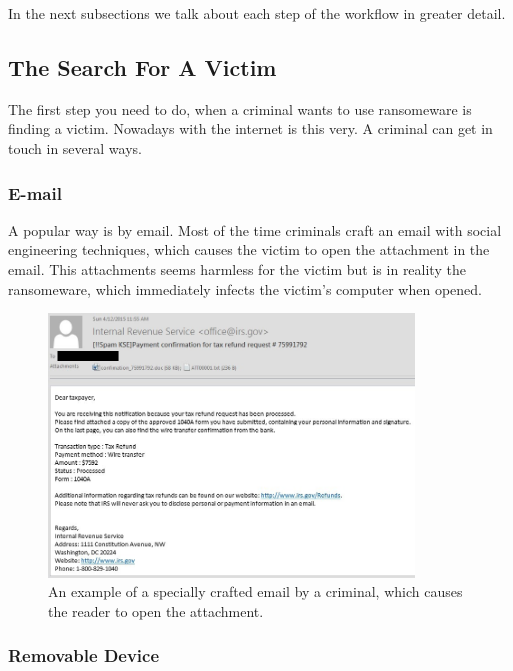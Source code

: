 In the next subsections we talk about each step of the workflow in greater detail.

\subsection{The Search For A Victim}\label{search}

The first step you need to do, when a criminal wants to use ransomeware is finding a victim. Nowadays with the internet is this very. A criminal can get in touch in several ways.

\subsubsection{E-mail}

A popular way is by email. Most of the time criminals craft an email with social engineering techniques, which causes the victim to open the attachment in the email. This attachments seems harmless for the victim but is in reality the ransomeware, which immediately infects the victim's computer when opened.


\begin{figure}[H]
    \centering 
    \includegraphics[height=7cm]{example_ransomemail}
    \caption[]{An example of a specially crafted email by a criminal, which causes the reader to open the attachment.\protect\footnotemark}
    \label{ransomemail}
\end{figure}

\subsubsection{Removable Device}


